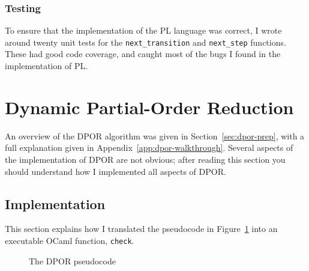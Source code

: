 \documentclass[12pt,a4paper,twoside,openright]{report}
\begin{document}
\subsubsection{Testing}
To ensure that the implementation of the PL
language was correct, I wrote around
twenty unit tests for
the \texttt{next\_transition} and
\texttt{next\_step} functions. These had good
code coverage, and caught most of the bugs I
found in the implementation of PL.


\section{Dynamic Partial-Order Reduction}
An overview of the DPOR
algorithm was given in Section~\ref{sec:dpor-prep},
with a full explanation
given in Appendix~\ref{app:dpor-walkthrough}.
Several aspects of the implementation of DPOR
are not obvious; after reading this section
you should understand how I implemented
all aspects of DPOR.

\subsection{Implementation}
This section explains how I translated
the pseudocode in Figure~\ref{fig:dpor-imp-pscode}
into an executable OCaml function, \texttt{check}.

\begin{figure}
	\dporpseudocode
	\caption{The DPOR pseudocode}
	\label{fig:dpor-imp-pscode}
\end{figure}
\end{document}
